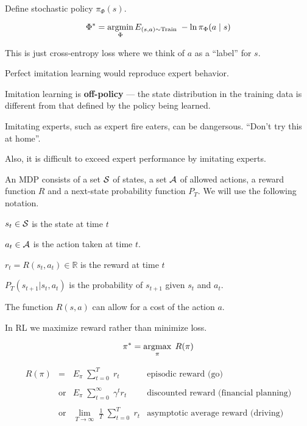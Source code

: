 {\vfill
Define stochastic policy $\pi_\Phi(s)$.

\vfill
$$\Phi^* = \operatorname*{argmin}_\Phi E_{(s,a) \sim \mathrm{Train}}\;- \ln \pi_\Phi(a\;|\;s)$$

\vfill
This is just cross-entropy loss where we think of $a$ as a ``label'' for $s$.


Perfect imitation learning would reproduce expert behavior.

Imitation learning is {\bf off-policy} ---
the state distribution in the training data is different from that defined by the policy being learned.

\vfill
Imitating experts, such as expert fire eaters, can be dangersous.  ``Don't try this at home''.

\vfill
Also, it is difficult to exceed expert performance by imitating experts.


An MDP consists of a set ${\cal S}$ of states, a set ${\cal A}$ of allowed actions, a reward function $R$
and a next-state probability function $P_T$.  We will use the following notation.

\vfill
$s_t \in {\cal S}$ is the state at time $t$

\vfill
$a_t \in {\cal A}$ is the action taken at time $t$.

\vfill
$r_t = R(s_t,a_t) \in \mathbb{R}$ is the reward at time $t$

\vfill
$P_T(s_{t+1}|s_t,a_t)$ is the probability of $s_{t+1}$ given $s_t$ and $a_t$.

\vfill
The function $R(s,a)$ can allow for a cost of the action $a$.


In RL we maximize reward rather than minimize loss.

$$\pi^* = \operatorname*{argmax}_\pi \;R(\pi)$$

\vfill
$$\begin{array}{rcll}
  R(\pi) & = & E_\pi\;\sum_{t=0}^T \;r_t &\mbox{episodic reward (go)} \\
\\
& \mbox{or} & E_\pi\;\sum_{t=0}^\infty \;\gamma^t r_t &\mbox{discounted reward (financial planning)} \\
\\
& \mbox{or} & \lim_{T \rightarrow \infty}\;\frac{1}{T} \;\sum_{t=0}^T \;r_t &\mbox{asymptotic average reward (driving)}
\end{array}$$


}
